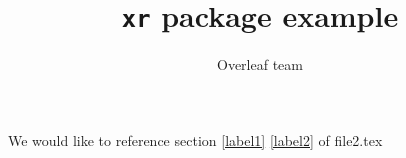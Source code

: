 \documentclass{article}
\title{\texttt{xr} package example}
\author{Overleaf team}
\begin{document}
\maketitle
We would like to reference section \ref{label1} \ref{label2} of file2.tex
\end{document}

